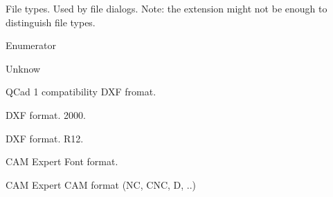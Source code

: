 File types. Used by file dialogs. Note\-: the extension might not be enough to distinguish file types. \begin{Desc}
\item[Enumerator]\par
\begin{description}
\item[{\em 
\hypertarget{class_r_s2_ab876c252f8508d8947bb85cbbdd95b91abbd9ecffa4b1eb72a46357317ef44a43}{Format\-Unknown}\label{class_r_s2_ab876c252f8508d8947bb85cbbdd95b91abbd9ecffa4b1eb72a46357317ef44a43}
}]Unknow \item[{\em 
\hypertarget{class_r_s2_ab876c252f8508d8947bb85cbbdd95b91a9be5fc14b3cc3bd7142c11ecd698216d}{Format\-D\-X\-F1}\label{class_r_s2_ab876c252f8508d8947bb85cbbdd95b91a9be5fc14b3cc3bd7142c11ecd698216d}
}]Q\-Cad 1 compatibility D\-X\-F fromat. \item[{\em 
\hypertarget{class_r_s2_ab876c252f8508d8947bb85cbbdd95b91a77470b383b60faceee7dfde79b50eaba}{Format\-D\-X\-F}\label{class_r_s2_ab876c252f8508d8947bb85cbbdd95b91a77470b383b60faceee7dfde79b50eaba}
}]D\-X\-F format. 2000. \item[{\em 
\hypertarget{class_r_s2_ab876c252f8508d8947bb85cbbdd95b91a776212e269d106e2c5ef65e9c36df7ec}{Format\-D\-X\-F12}\label{class_r_s2_ab876c252f8508d8947bb85cbbdd95b91a776212e269d106e2c5ef65e9c36df7ec}
}]D\-X\-F format. R12. \item[{\em 
\hypertarget{class_r_s2_ab876c252f8508d8947bb85cbbdd95b91a9a2b7d7e9a64cd2022b599ff547c250c}{Format\-C\-X\-F}\label{class_r_s2_ab876c252f8508d8947bb85cbbdd95b91a9a2b7d7e9a64cd2022b599ff547c250c}
}]C\-A\-M Expert Font format. \item[{\em 
\hypertarget{class_r_s2_ab876c252f8508d8947bb85cbbdd95b91a39b5425fef0242bc27885e19686d60f3}{Format\-C\-A\-M}\label{class_r_s2_ab876c252f8508d8947bb85cbbdd95b91a39b5425fef0242bc27885e19686d60f3}
}]C\-A\-M Expert C\-A\-M format (N\-C, C\-N\-C, D, ..) \end{description}
\end{Desc}
